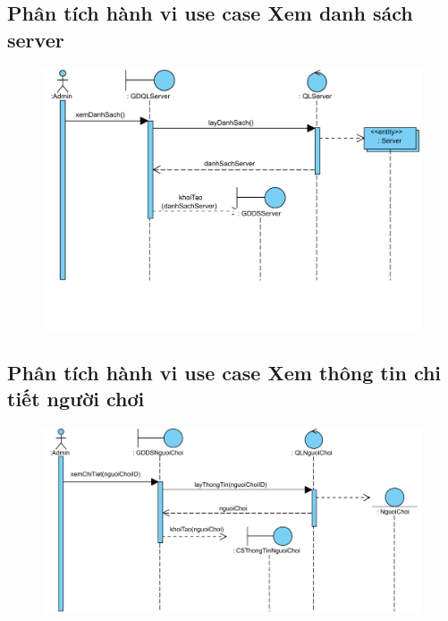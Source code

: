 \documentclass[3p]{elsarticle}
\begin{document}
\subsection{Phân tích hành vi use case Xem danh sách server}
\begin{figure}[!htbp]
	\hspace*{-.5in}
	\centering
	\includegraphics[scale=.55]{images/sequence-pdfs/admin/viewListServer.pdf}
\end{figure}
\newpage

\subsection{Phân tích hành vi use case Xem thông tin chi tiết người chơi}
\begin{figure}[!htbp]
	\hspace*{-.5in}
	\centering
	\includegraphics[scale=.55]{images/sequence-pdfs/admin/viewPlayerDetails.pdf}
\end{figure}
\newpage
\end{document}

